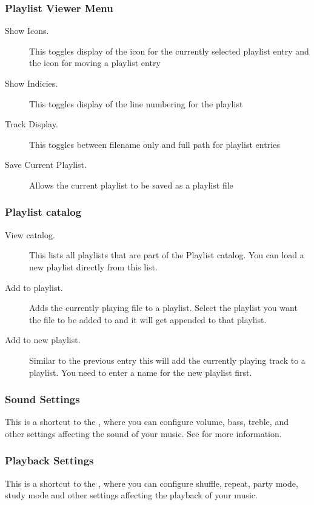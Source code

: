\subsubsection{Playlist Viewer Menu}
  \begin{description}
    \item[Show Icons.] This toggles display of the icon for the currently selected 
    playlist entry and the icon for moving a playlist entry
    \item[Show Indicies.] This toggles display of the line numbering for the playlist
    \item[Track Display.] This toggles between filename only and full path for playlist entries
    \item[Save Current Playlist.] Allows the current playlist to be saved as a  playlist file
  \end{description}

    
\subsubsection{Playlist catalog}
  \begin{description}
    \item [View catalog.] This lists all playlists that are part of the
    Playlist catalog. You can load a new playlist directly from this list.
    \item [Add to playlist.] Adds the currently playing file to a playlist.
    Select the playlist you want the file to be added to and it will get
    appended to that playlist.
    \item [Add to new playlist.] Similar to the previous entry this will
    add the currently playing track to a playlist. You need to enter a name
    for the new playlist first.
  \end{description}

\subsubsection{Sound Settings}
This is a shortcut to the , where you can configure volume,
bass, treble, and other settings affecting the sound of your music.  
See  for more information.

\subsubsection{Playback Settings}
This is a shortcut to the , where you can configure shuffle,
repeat, party mode, study mode and other settings affecting the playback of your music.  

